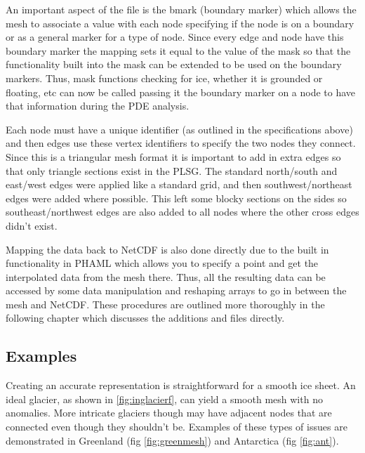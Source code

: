 An important aspect of the file is the bmark (boundary marker) which allows the mesh to associate a value with each node specifying if the node is on a boundary or as a general marker for a type of node.  Since every edge and node have this boundary marker the mapping sets it equal to the value of the mask so that the functionality built into the mask can be extended to be used on the boundary markers.  Thus, mask functions checking for ice, whether it is grounded or floating, etc can now be called passing it the boundary marker on a node to have that information during the PDE analysis.

Each node must have a unique identifier (as outlined in the specifications above) and then edges use these vertex identifiers to specify the two nodes they connect.  Since this is a triangular mesh format it is important to add in extra edges so that only triangle sections exist in the PLSG.  The standard north/south and east/west edges were applied like a standard grid, and then southwest/northeast edges were added where possible.  This left some blocky sections on the sides so southeast/northwest edges are also added to all nodes where the other cross edges didn't exist. 

Mapping the data back to NetCDF is also done directly due to the built in functionality in PHAML which allows you to specify a point and get the interpolated data from the mesh there.  Thus, all the resulting data can be accessed by some data manipulation and reshaping arrays to go in between the mesh and NetCDF.  These procedures are outlined more thoroughly in the following chapter which discusses the additions and files directly. 

\subsection{Examples}

Creating an accurate representation is straightforward for a smooth ice sheet.  An ideal glacier, as shown in \ref{fig:inglacierf}, can yield a smooth mesh with no anomalies.  More intricate glaciers though may have adjacent nodes that are connected even though they shouldn't be.  Examples of these types of issues are demonstrated in Greenland (fig \ref{fig:greenmesh}) and Antarctica (fig \ref{fig:ant}). 


